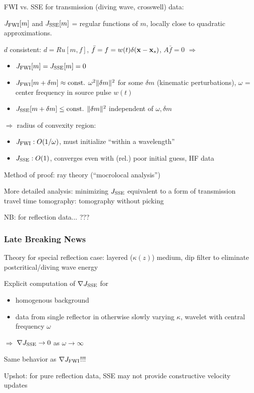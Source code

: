 \documentclass[xcolor=dvipsnames,12pt,aspectratio=169]{beamer}
\newcommand{\of}{\bar{f}}
\begin{document}
\begin{frame}
FWI vs. SSE for transmission (diving wave, crosswell) data:

$J_{\rm FWI}[m]$ and $J_{\rm SSE}[m]$ = regular functions of $m$, locally close to quadratic approximations.

$d$ consistent: $d=Ru[m,f]$, $\of = f = w(t)\delta(\bx-\bx_s)$, $A\of=0$ $\Rightarrow$

\begin{itemize}
\item  $J_{\rm FWI}[m]=J_{\rm SSE}[m]=0$
\vspace{0.5cm}
\item $J_{\rm FWI}[m + \delta m] \approx \mbox{const. }\omega^2 \|\delta m\|^2$ for some $\delta m$ (kinematic perturbations), $\omega$ = center frequency in source pulse $w(t)$
\vspace{0.5cm}
\item $J_{\rm SSE}[m+\delta m] \le \mbox{const. }\|\delta m\|^2$ independent of $\omega, \delta m$
\end{itemize}
\end{frame}

\begin{frame}
$\Rightarrow$ radius of convexity region:
\begin{itemize}
\item $J_{\rm FWI}: O(1/\omega)$, must initialize ``within a wavelength''
\item $J_{\rm SSE}: O(1)$, converges even with (rel.) poor initial guess, HF data
\end{itemize}

Method of proof: ray theory (``mocrolocal analysis'')

More detailed analysis: minimizing $J_{\rm SSE}$ equivalent to a form of transmission travel time tomography: {\color{blue} tomography without picking} 

NB: for reflection data... ???
\end{frame}

\begin{frame}\frametitle{Late Breaking News}
Theory for special reflection case: layered ($\kappa(z)$) medium, dip filter to eliminate postcritical/diving wave energy

Explicit computation of $\nabla J_{\rm SSE}$ for 
\begin{itemize}
\item homogenous background 
\item data from single reflector in otherwise slowly varying $\kappa$, wavelet with central frequency $\omega$
\end{itemize}
$\Rightarrow$ $\nabla J_{\rm SSE} \rightarrow 0$ as $\omega \rightarrow \infty$

Same behavior as $\nabla J_{\rm FWI}$!!!

Upshot: for pure reflection data, SSE may not provide constructive velocity updates
\end{frame}
\end{document}

